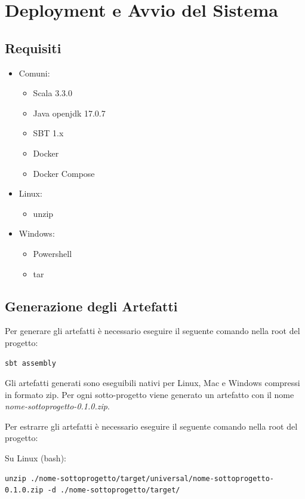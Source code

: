 \documentclass{scrartcl}
\begin{document}
\section{Deployment e Avvio del Sistema}

\subsection{Requisiti}
\begin{itemize}
    \item Comuni:
        \begin{itemize}
        \item Scala 3.3.0
        \item Java openjdk 17.0.7
        \item SBT 1.x
        \item Docker
        \item Docker Compose
        \end{itemize}
    \item Linux:
        \begin{itemize}
            \item unzip
        \end{itemize}
    \item Windows:
        \begin{itemize}
            \item Powershell
            \item tar
        \end{itemize}
\end{itemize}

\subsection{Generazione degli Artefatti}

Per generare gli artefatti è necessario eseguire il seguente comando nella root del progetto:

\begin{lstlisting}
sbt assembly
\end{lstlisting}

Gli artefatti generati sono eseguibili nativi per Linux, Mac e Windows compressi in formato zip. Per ogni sotto-progetto viene generato un artefatto con il nome \textit{nome-sottoprogetto-0.1.0.zip}.

Per estrarre gli artefatti è necessario eseguire il seguente comando nella root del progetto:

Su Linux (bash):
\begin{lstlisting}
unzip ./nome-sottoprogetto/target/universal/nome-sottoprogetto-0.1.0.zip -d ./nome-sottoprogetto/target/
\end{lstlisting}
\end{document}

